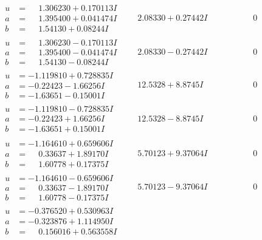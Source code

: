\documentclass[1p]{elsarticle_modified}
\theoremstyle{definition}
\begin{document}
$$\begin{array}{c|c|c}
\begin{aligned}
u &= \phantom{-}1.306230 + 0.170113 I \\
a &= \phantom{-}1.395400 + 0.041474 I \\
b &= \phantom{-}1.54130 + 0.08244 I\end{aligned}
 & \phantom{-}2.08330 + 0.27442 I & \phantom{-0.000000 } 0 \\ \hline\begin{aligned}
u &= \phantom{-}1.306230 - 0.170113 I \\
a &= \phantom{-}1.395400 - 0.041474 I \\
b &= \phantom{-}1.54130 - 0.08244 I\end{aligned}
 & \phantom{-}2.08330 - 0.27442 I & \phantom{-0.000000 } 0 \\ \hline\begin{aligned}
u &= -1.119810 + 0.728835 I \\
a &= -0.22423 - 1.66256 I \\
b &= -1.63651 - 0.15001 I\end{aligned}
 & \phantom{-}12.5328 + 8.8745 I & \phantom{-0.000000 } 0 \\ \hline\begin{aligned}
u &= -1.119810 - 0.728835 I \\
a &= -0.22423 + 1.66256 I \\
b &= -1.63651 + 0.15001 I\end{aligned}
 & \phantom{-}12.5328 - 8.8745 I & \phantom{-0.000000 } 0 \\ \hline\begin{aligned}
u &= -1.164610 + 0.659606 I \\
a &= \phantom{-}0.33637 + 1.89170 I \\
b &= \phantom{-}1.60778 + 0.17375 I\end{aligned}
 & \phantom{-}5.70123 + 9.37064 I & \phantom{-0.000000 } 0 \\ \hline\begin{aligned}
u &= -1.164610 - 0.659606 I \\
a &= \phantom{-}0.33637 - 1.89170 I \\
b &= \phantom{-}1.60778 - 0.17375 I\end{aligned}
 & \phantom{-}5.70123 - 9.37064 I & \phantom{-0.000000 } 0 \\ \hline\begin{aligned}
u &= -0.376520 + 0.530963 I \\
a &= -0.323876 + 1.114950 I \\
b &= \phantom{-}0.156016 + 0.563558 I\end{aligned}

\end{array}$$
\end{document}
